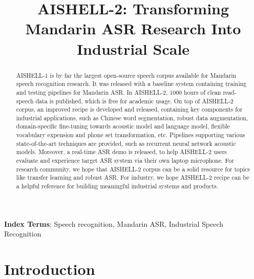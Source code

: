 \documentclass[a4paper]{article}
\title{AISHELL-2: Transforming Mandarin ASR Research Into Industrial Scale}
\begin{document}
\maketitle
%
\begin{abstract}
AISHELL-1 is by far the largest open-source speech corpus available for Mandarin
speech recognition research. It was released with a baseline system containing
training and testing pipelines for Mandarin ASR. In AISHELL-2, 1000 hours of
clean read-speech data is published, which is free for academic usage. On top of
AISHELL-2 corpus, an improved recipe is developed and released, containing key
components for industrial applications, such as Chinese word segmentation,
robust data augmentation, domain-specific fine-tuning towards acoustic model and
language model, flexible vocabulary expension and phone set transformation,
etc. Pipelines supporting various state-of-the-art techniques are provided, such
as recurrent neural network acoustic models. Moreover, a real-time ASR demo is
released, to help AISHELL-2 users evaluate and experience target ASR system via
their own laptop microphone. For research community, we hope that AISHELL-2
corpus can be a solid resource for topics like transfer learning and robust
ASR. For industry, we hope AISHELL-2 recipe can be a helpful reference for
building meaningful industrial systems and products.
\end{abstract}
\noindent\textbf{Index Terms}: Speech recognition, Mandarin ASR, Industrial Speech Recognition

\section{Introduction}
\end{document}
